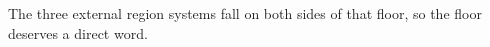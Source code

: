 The three external region systems fall on both sides of that floor, so the floor deserves a
direct word.
